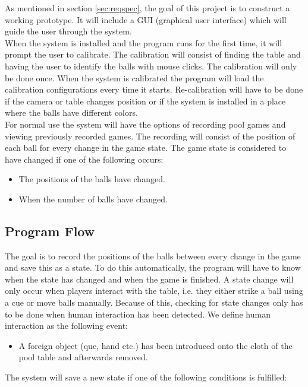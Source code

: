 As mentioned in section \ref{sec:reqspec}, the goal of this project is to construct a working prototype. It will include a GUI (graphical user interface) which will guide the user through the system.\\

When the system is installed and the program runs for the first time, it will prompt the user to calibrate. The calibration will consist of finding the table and having the user to identify the balls with mouse clicks. The calibration will only be done once. When the system is calibrated the program will load the calibration configurations every time it starts. Re-calibration will have to be done if the camera or table changes position or if the system is installed in a place where the balls have different colors.\\

For normal use the system will have the options of recording pool games and viewing previously recorded games. The recording will consist of the position of each ball for every change in the game state. The game state is considered to have changed if one of the following occurs:\\ 
\begin{itemize}
	\item The positions of the balls have changed.
	\item When the number of balls have changed.
\end{itemize}

\subsection{Program Flow}
The goal is to record the positions of the balls between every change in the game and save this as a state. To do this automatically, the program will have to know when the state has changed and when the game is finished. A state change will only occur when players interact with the table, i.e. they either strike a ball using a cue or move balls manually. Because of this, checking for state changes only has to be done when human interaction has been detected. We define human interaction as the following event:
\begin{itemize}
	\item  A foreign object (que, hand etc.) has been introduced onto the cloth of the pool table and afterwards removed.
\end{itemize}

The system will save a new state if one of the following conditions is fulfilled:

